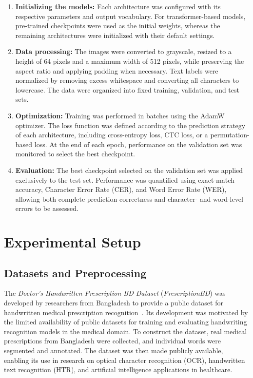 \documentclass[11pt,a4paper]{article}
\begin{document}
\begin{enumerate}
\item \textbf{Initializing the models:} Each architecture was configured with its respective parameters and output vocabulary. For transformer-based models, pre-trained checkpoints were used as the initial weights, whereas the remaining architectures were initialized with their default settings.


	\item \textbf{Data processing:} The images were converted to grayscale, resized to a height of 64 pixels and a maximum width of 512 pixels, while preserving the aspect ratio and applying padding when necessary. Text labels were normalized by removing excess whitespace and converting all characters to lowercase. The data were organized into fixed training, validation, and test sets.

	\item \textbf{Optimization:} Training was performed in batches using the AdamW optimizer. The loss function was defined according to the prediction strategy of each architecture, including cross-entropy loss, CTC loss, or a permutation-based loss. At the end of each epoch, performance on the validation set was monitored to select the best checkpoint.
	
	\item \textbf{Evaluation:} The best checkpoint selected on the validation set was applied exclusively to the test set. Performance was quantified using exact-match accuracy, Character Error Rate (CER), and Word Error Rate (WER), allowing both complete prediction correctness and character- and word-level errors to be assessed.
	
	
\end{enumerate}

\section{Experimental Setup}
\label{sec:experiments}

\subsection{Datasets and Preprocessing}
\label{sec:datasets}


The \textit{Doctor's Handwritten Prescription BD Dataset} (\textit{PrescriptionBD}) was developed by researchers from Bangladesh to provide a public dataset for handwritten medical prescription recognition~\cite{mia2024deep}. Its development was motivated by the limited availability of public datasets for training and evaluating handwriting recognition models in the medical domain. To construct the dataset, real medical prescriptions from Bangladesh were collected, and individual words were segmented and annotated. The dataset was then made publicly available, enabling its use in research on optical character recognition (OCR), handwritten text recognition (HTR), and artificial intelligence applications in healthcare.
\end{document}
